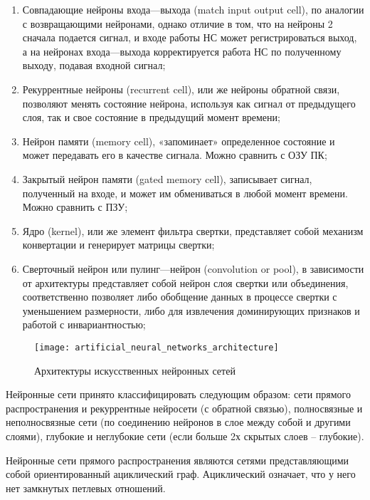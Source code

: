 \begin{enumerate}
        \item Совпадающие нейроны входа—выхода (match input output cell), по аналогии с возвращающими нейронами, однако отличие в том, что на нейроны 2 сначала подается сигнал, и входе работы НС может регистрироваться выход, а на нейронах входа—выхода корректируется работа НС по полученному выходу, подавая входной сигнал;
        \item Рекуррентные нейроны (recurrent cell), или же нейроны обратной связи, позволяют менять состояние нейрона, используя как сигнал от предыдущего слоя, так и свое состояние в предыдущий момент времени;
        \item Нейрон памяти (memory cell), «запоминает» определенное состояние и может передавать его в качестве сигнала. Можно сравнить с ОЗУ ПК;
        \item Закрытый нейрон памяти (gated memory cell), записывает сигнал, полученный на входе, и может им обмениваться в любой момент времени. Можно сравнить с ПЗУ;
        \item Ядро (kernel), или же элемент фильтра свертки, представляет собой механизм конвертации и генерирует матрицы свертки;
        \item Сверточный нейрон или пулинг—нейрон (convolution or pool), в зависимости от архитектуры представляет собой нейрон слоя свертки или объединения, соответственно позволяет либо обобщение данных в процессе свертки с уменьшением размерности, либо для извлечения доминирующих признаков и работой с инвариантностью;
    \end{enumerate}

    \begin{figure}[ht]
        \centering
        \texttt{[image: artificial\_neural\_networks\_architecture]}
        \caption{Архитектуры искусственных нейронных сетей}
        \label{fig:artificial_neural_networks_architecture}
    \end{figure}

    Нейронные сети принято классифицировать следующим образом: сети прямого распространения и рекуррентные нейросети (с обратной связью), полносвязные и неполносвязные сети (по соединению нейронов в слое между собой и другими слоями), глубокие и неглубокие сети (если больше 2х скрытых слоев – глубокие).
    
    Нейронные сети прямого распространения являются сетями представляющими собой ориентированный ациклический граф. Ациклический означает, что у него нет замкнутых петлевых отношений.
    
